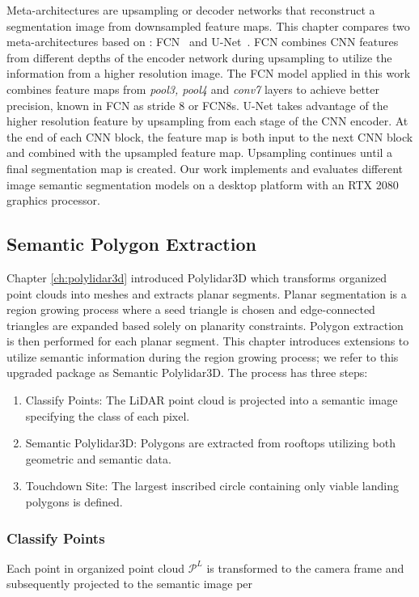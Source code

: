 Meta-architectures are upsampling or decoder networks that reconstruct a segmentation image from downsampled feature maps. This chapter compares two meta-architectures based on \cite{siam_comparative_2018}: FCN~\cite{shelhamer_fully_2017} and U-Net~\cite{ronneberger_u-net_2015}. FCN combines CNN features from different depths of the encoder network during upsampling to utilize the information from a higher resolution image. The FCN model applied in this work combines feature maps from \textit{pool3, pool4} and \textit{conv7} layers to achieve better precision, known in FCN as stride 8 or FCN8s. U-Net takes advantage of the higher resolution feature by upsampling from each stage of the CNN encoder. At the end of each CNN block, the feature map is both input to the next CNN block and combined with the upsampled feature map.  Upsampling continues until a final segmentation map is created.
Our work implements and evaluates different image semantic segmentation models \cite{siam_comparative_2018} on a desktop platform with an RTX 2080 graphics processor.

\subsection{Semantic Polygon Extraction}\label{sec:ch6_methods_semantic_polygons}

Chapter \ref{ch:polylidar3d} introduced Polylidar3D which transforms organized point clouds into meshes and extracts planar segments. Planar segmentation is a region growing process where a seed triangle is chosen and edge-connected triangles are expanded based solely on planarity constraints. Polygon extraction is then performed for each planar segment. This chapter introduces extensions to utilize semantic information during the region growing process; we refer to this upgraded package as Semantic Polylidar3D. The process has three steps:

\begin{enumerate}
    \item Classify Points: The LiDAR point cloud is projected into a semantic image specifying the class of each pixel.
    \item Semantic Polylidar3D: Polygons are extracted from rooftops utilizing both geometric and semantic data.
    \item Touchdown Site:  The largest inscribed circle containing only viable landing polygons is defined.
\end{enumerate}

\subsubsection{Classify Points}
Each point in organized point cloud $\mathcal{P}^L$ is transformed to the camera frame and subsequently projected to the semantic image per

